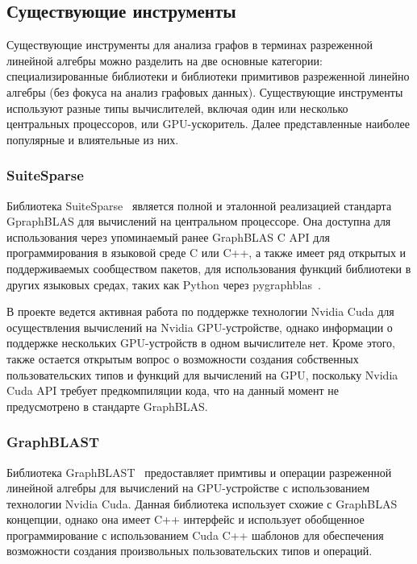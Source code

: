 \subsection{Существующие инструменты}

Существующие инструменты для анализа графов в терминах разреженной линейной алгебры можно разделить на две основные категории: специализированные библиотеки и библиотеки примитивов разреженной линейно алгебры (без фокуса на анализ графовых данных). Существующие инструменты используют разные типы вычислителей, включая один или несколько центральных процессоров, или GPU-ускоритель. Далее представленные наиболее популярные и влиятельные из них.

\subsubsection*{SuiteSparse}

Библиотека SuiteSparse~\cite{article:suite_sparse_for_graph_problems} является полной и эталонной реализацией стандарта GpraphBLAS для вычислений на центральном процессоре. Она доступна для использования через упоминаемый ранее GraphBLAS C API для программирования в языковой среде C или C++, а также имеет ряд открытых и поддерживаемых сообществом пакетов, для использования функций библиотеки в других языковых средах, таких как Python через pygraphblas~\cite{net:pygraphblas}. 

В проекте ведется активная работа по поддержке технологии Nvidia Cuda для осуществления вычислений на Nvidia GPU-устройстве, однако информации о поддержке нескольких GPU-устройств в одном вычислителе нет. Кроме этого, также остается открытым вопрос о возможности создания собственных пользовательских типов и функций для вычислений на GPU, поскольку Nvidia Cuda API требует предкомпиляции кода, что на данный момент не предусмотрено в стандарте GraphBLAS.  

\subsubsection*{GraphBLAST}

Библиотека GraphBLAST~\cite{yang2019graphblast} предоставляет примтивы и операции разреженной линейной алгебры для вычислений на GPU-устройстве с использованием технологии Nvidia Cuda. Данная библиотека использует схожие с GraphBLAS концепции, однако она имеет C++ интерфейс и использует обобщенное программирование с использованием Cuda C++ шаблонов для обеспечения возможности создания произвольных пользовательских типов и операций.

